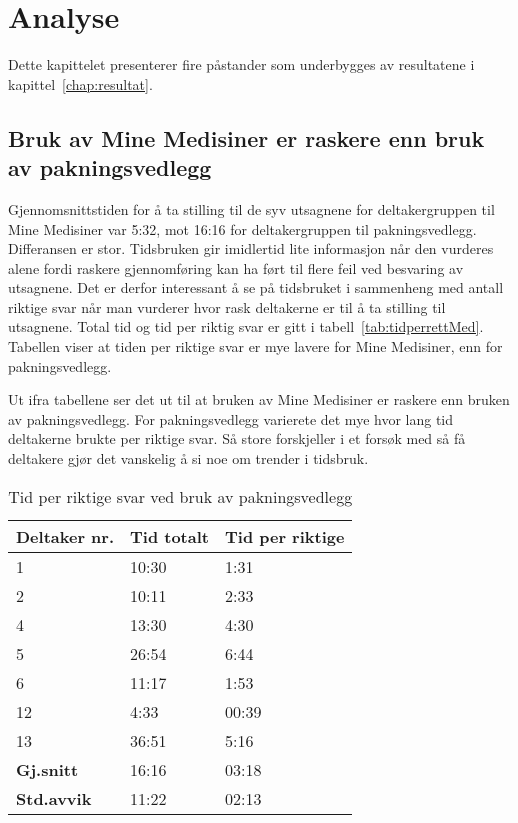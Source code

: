 \chapter{Analyse}\label{chap:analyse}
Dette kapittelet presenterer fire påstander som underbygges av resultatene i  kapittel~\ref{chap:resultat}. 


\section[Tidsbruk]{Bruk av Mine Medisiner er raskere enn bruk av pakningsvedlegg}
Gjennomsnittstiden for å ta stilling til de syv utsagnene for deltakergruppen til Mine Medisiner var 5:32, mot 16:16 for deltakergruppen til pakningsvedlegg. Differansen er stor. Tidsbruken gir imidlertid lite informasjon når den vurderes alene fordi raskere gjennomføring kan ha ført til flere feil ved besvaring av utsagnene. Det er derfor interessant å se på tidsbruket i sammenheng med antall riktige svar når man vurderer hvor rask deltakerne er til å ta stilling til utsagnene. Total tid og tid per riktig svar er gitt i tabell~\ref{tab:tidperrettMed}. Tabellen viser at tiden per riktige svar er mye lavere for Mine Medisiner, enn for pakningsvedlegg. 

Ut ifra tabellene ser det ut til at bruken av Mine Medisiner er raskere enn bruken av pakningsvedlegg. For pakningsvedlegg varierete det mye hvor lang tid deltakerne brukte per riktige svar. Så store forskjeller i et forsøk med så få deltakere gjør det vanskelig å si noe om trender i tidsbruk.


\begin{table}[H]
    \centering
    \begin{tabular}{ | p{2cm} | p{3cm} |  p{3cm} |  }
      \hline
       \textbf{Deltaker nr.} & \textbf{Tid totalt} & \textbf{Tid per riktige}\\ \hline
        1 & 10:30  &1:31\\ \hline
        2 & 10:11 &2:33\\ \hline
        4 & 13:30  &4:30\\ \hline
        5 & 26:54  &6:44\\ \hline
        6 &  11:17 & 1:53\\ \hline
        12 & 4:33 & 00:39\\ \hline
        13 & 36:51 &5:16\\ \hline \hline
        \textbf{Gj.snitt} & 16:16 & 03:18 \\ \hline
        \textbf{Std.avvik} & 11:22 & 02:13\\ \hline
    \end{tabular}
    \caption{Tid per riktige svar ved bruk av pakningsvedlegg}
    \label{tab:tidperrettPak}
\end{table}

